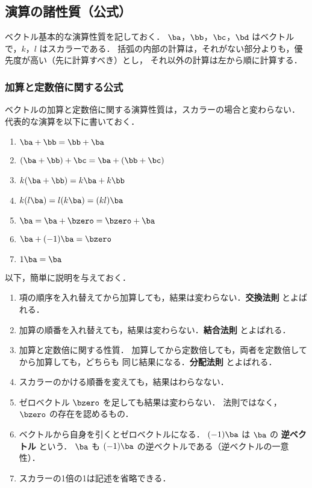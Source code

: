                 \subsection{演算の諸性質（公式）}
        \begin{mycomment}
            ベクトル基本的な演算性質を記しておく．
            $\ba$，$\bb$，$\bc$，$\bd$ はベクトルで，$k$，$l$ はスカラーである．
            括弧の内部の計算は，それがない部分よりも，優先度が高い（先に計算すべき）とし，
            それ以外の計算は左から順に計算する．
        \end{mycomment}

        \subsubsection{加算と定数倍に関する公式}
            ベクトルの加算と定数倍に関する演算性質は，スカラーの場合と変わらない．
            代表的な演算を以下に書いておく．
            \begin{enumerate}
                \item $\ba + \bb = \bb + \ba$
                \item $(\ba + \bb ) +\bc = \ba + (\bb + \bc)$
                \item $k (\ba + \bb) = k\ba + k\bb$
                \item $k(l\ba) = l(k\ba) =(kl)\ba$
                \item $\ba = \ba + \bzero = \bzero + \ba$
                \item $\ba +(-1)\ba = \bzero$
                \item $1\ba = \ba$
            \end{enumerate}

            以下，簡単に説明を与えておく．
            \begin{enumerate}
                \item 項の順序を入れ替えてから加算しても，結果は変わらない．\textbf{交換法則} とよばれる．
                \item 加算の順番を入れ替えても，結果は変わらない．\textbf{結合法則} とよばれる．
                \item 加算と定数倍に関する性質．
                      加算してから定数倍しても，両者を定数倍してから加算しても，どちらも
                      同じ結果になる．\textbf{分配法則} とよばれる．
                \item スカラーのかける順番を変えても，結果はわらなない．
                \item ゼロベクトル $\bzero$ を足しても結果は変わらない．
                      法則ではなく，$\bzero$ の存在を認めるもの．
                \item ベクトルから自身を引くとゼロベクトルになる．
                      $(-1)\ba$ は $\ba$ の \textbf{逆ベクトル} という．
                      $\ba$ も $(-1)\ba$ の逆ベクトルである（逆ベクトルの一意性）．
                \item スカラーの1倍の1は記述を省略できる．
            \end{enumerate}

